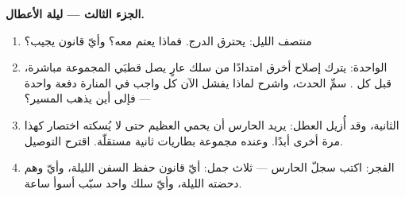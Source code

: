 \begin{problem}
\medskip\noindent\textbf{الجزء الثالث --- ليلة الأعطال.}
\begin{enumerate}[resume]
  \item منتصف الليل: يحترق  الدرج. فماذا يعتم معه؟ وأيّ
        قانون يجيب؟
  \item الواحدة: يترك إصلاح أخرق امتدادًا من سلك عارٍ يصل
        قطبَي المجموعة مباشرة، قبل كل . سمِّ الحدث، واشرح
        لماذا يفشل الآن كل واجب في المنارة دفعة واحدة ---
        فإلى أين يذهب المسير؟
  \item الثانية، وقد أُزيل العطل: يريد الحارس أن يحمي 
        العظيم حتى لا يُسكته اختصار كهذا مرة أخرى أبدًا.
        وعنده مجموعة بطاريات ثانية مستقلّة. اقترح التوصيل.
  \item الفجر: اكتب سجلّ الحارس --- ثلاث جمل: أيّ قانون حفظ
        السفن الليلة، وأيّ وهم دحضته الليلة، وأيّ سلك واحد
        سبّب أسوأ ساعة.
\end{enumerate}
\end{problem}
